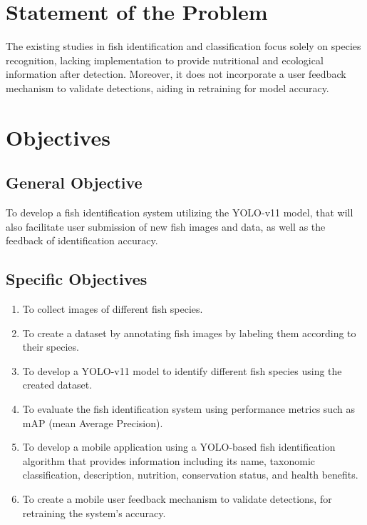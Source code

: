 \section{Statement of the Problem}

The existing studies in fish identification and classification focus solely on species recognition, lacking implementation to provide nutritional and ecological information after detection. Moreover, it does not incorporate a user feedback mechanism to validate detections, aiding in retraining for model accuracy. 


\section{Objectives} 

\subsection{General Objective}
To develop a fish identification system utilizing the YOLO-v11 model, that will also facilitate user submission of new fish images and data, as well as the feedback of identification accuracy.


\subsection{Specific Objectives}
\begin{enumerate}
 \item To collect images of different fish species. 
 \item To create a dataset by annotating fish images by labeling them according to their species.
 \item To develop a YOLO-v11 model to identify different fish species using the created dataset.
 \item To evaluate the fish identification system using performance metrics such as mAP (mean Average Precision).
 \item To develop a mobile application using a YOLO-based fish identification algorithm that provides information including its name, taxonomic classification, description, nutrition, conservation status, and health benefits.
 \item To create a mobile user feedback mechanism to validate detections, for retraining the system's accuracy.
\end{enumerate}




